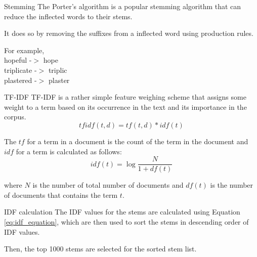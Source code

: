 \documentclass[12pt]{beamer}
\begin{document}
\begin{frame}{Stemming}
    The Porter's algorithm\cite{porter1980algorithm} is a popular stemming algorithm that can reduce the inflected words to their stems. 

    It does so by removing the suffixes from a inflected word using production rules.

    For example, \\
        hopeful -$>$ hope \\
        triplicate -$>$ triplic \\
        plastered -$>$ plaster \\
\end{frame}


\begin{frame}{TF-IDF}
TF-IDF\cite{sparck1972statistical} is a rather simple feature weighing scheme that assigns some weight to a term based on its occurrence in the text and its importance in the corpus.
    \begin{equation}
        \label{eq:tf_idf_equation}
        tfidf(t, d) = tf(t, d) * idf(t)
    \end{equation}

The $tf$ for a term in a document is the count of the term in the document and $idf$ for a term is calculated as follows:
\begin{equation}
    \label{eq:idf_equation}
    idf(t) = \log{\frac{N}{1 + df(t)}}
\end{equation}

where $N$ is the number of total number of documents and $df(t)$ is the number of documents that contains the term $t$.

\end{frame}

\begin{frame}{IDF calculation}
    The IDF values for the stems are calculated using Equation \ref{eq:idf_equation}, which are then used to sort the stems in descending order of IDF values.

    Then, the top 1000 stems are selected for the sorted stem list.
\end{frame}
\end{document}
